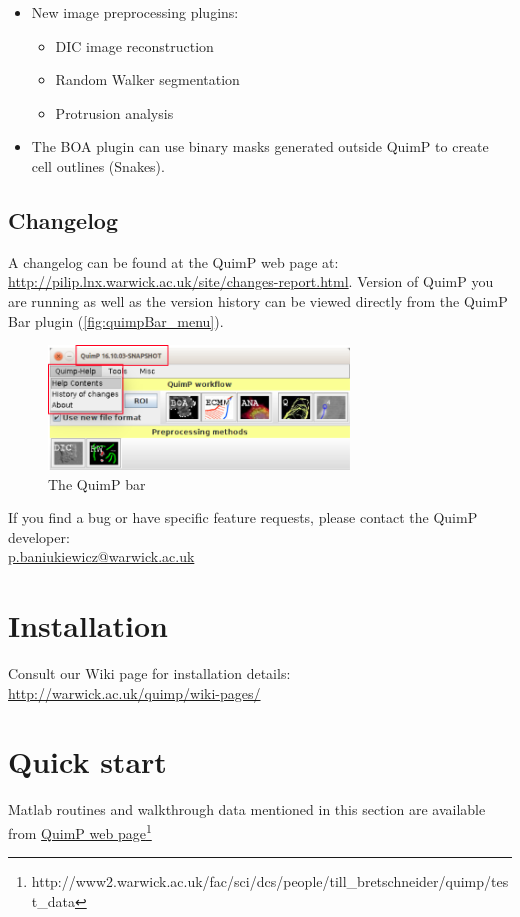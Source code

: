 \documentclass[a4paper,12pt]{article}
\begin{document}
\begin{enumerate}
\begin{itemize}
		\item New image preprocessing plugins:
		\begin{itemize}
			\item DIC image reconstruction
			\item Random Walker segmentation
			\item Protrusion analysis
		\end{itemize}   
		\item The BOA plugin can use binary masks generated outside QuimP to create cell outlines (Snakes).
	\end{itemize}
\end{enumerate}
	
\subsection{Changelog}
A changelog can be found at the QuimP web page at: \url{http://pilip.lnx.warwick.ac.uk/site/changes-report.html}.
Version of QuimP you are running as well as the version history can be viewed directly from the QuimP Bar plugin (\autoref{fig:quimpBar_menu}).
\begin{figure}[ht]
	\centering
	\includegraphics[width=8cm]{quimpBar_menu.png} %
	\caption{The QuimP bar}
	\label{fig:quimpBar_menu}
\end{figure}
 	
If you find a bug or have specific feature requests, please contact the QuimP developer:\\ \href{mailto:p.baniukiewicz@warwick.ac.uk}{p.baniukiewicz@warwick.ac.uk}

\section{Installation}

Consult our Wiki page for installation details:\\ \url{http://warwick.ac.uk/quimp/wiki-pages/}

\section{Quick start}
Matlab routines and walkthrough data mentioned in this section are available from
\href{http://www2.warwick.ac.uk/fac/sci/dcs/people/till_bretschneider/quimp/test_data}{QuimP web page}\footnote{http://www2.warwick.ac.uk/fac/sci/dcs/people/till\_bretschneider/quimp/test\_data}
\end{document}
